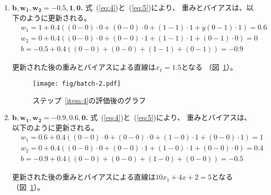\begin{enumerate}\renewcommand\labelenumi{\textbf{ステップ\arabic{enumi}. }}
\item \textbf{$\boldsymbol{b, w_1, w_2 = -0.5, 1, 0}$. }\label{item:4}
  式~(\ref{eq:4})と~(\ref{eq:5})により、
  重みとバイアスは、以下のように更新される。
  \begin{align*}
    &
      w_1 = 1 + 0.4 \left(
    ( 0 - 0) \cdot 0
     + (0 - 0) \cdot 0
     + (1 - 1) \cdot 1
     + y(0 - 1) \cdot 1
      \right) = 0.6
    \\&
      w_2 = 0 + 0.4 \left(
    ( 0 - 0) \cdot 0
     + (0 - 0) \cdot 1
     + (1 - 1) \cdot 1
     + (0 - 1) \cdot 0
      \right) = 0
    \\&
      b = -0.5 + 0.4 \left(
    ( 0 - 0)
     + (0 - 0)
     + (1 - 1)
     + (0 - 1)
      \right) = -0.9
  \end{align*}

  更新された後の重みとバイアスによる直線は$x_1 = 1.5$となる
  （図~\ref{fig:batch-2}）。

  \begin{figure}
    \centering
    \texttt{[image: fig/batch-2.pdf]}
    \caption{ステップ~\ref{item:4}の評価後のグラフ}
    \label{fig:batch-2}
  \end{figure}
  
\item \textbf{$\boldsymbol{b, w_1, w_2 = -0.9, 0.6, 0}$. }\label{item:5}
  式~(\ref{eq:4})と~(\ref{eq:5})により、
  重みとバイアスは、以下のように更新される。
  \begin{align*}
    &
      w_1 = 0.6 + 0.4 \left(
      ( 0 - 0) \cdot 0
     + (0 - 0) \cdot 0
     + (1 - 0) \cdot 1
     + (0 - 0) \cdot 1
      \right) = 1
    \\&
      w_2 = 0 + 0.4 \left(
    ( 0 - 0) \cdot 0
     + (0 - 0) \cdot 1
     + (1 - 0) \cdot 1
     + (0 - 0) \cdot 0
      \right) = 0.4
    \\&
      b = -0.9 + 0.4 \left(
    ( 0 - 0)
     + (0 - 0)
     + (1 - 0)
     + (0 - 0)
      \right) = -0.5
  \end{align*}

  更新された後の重みとバイアスによる直線は$10x_1 + 4x+2 = 5$となる
  （図~\ref{fig:batch-2}）。


\end{enumerate}
